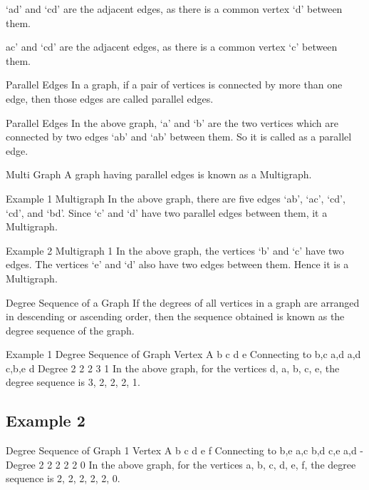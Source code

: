 ‘ad’ and ‘cd’ are the adjacent edges, as there is a common vertex ‘d’ between them.

ac’ and ‘cd’ are the adjacent edges, as there is a common vertex ‘c’ between them.

Parallel Edges
In a graph, if a pair of vertices is connected by more than one edge, then those edges are called parallel edges.

Parallel Edges
In the above graph, ‘a’ and ‘b’ are the two vertices which are connected by two edges ‘ab’ and ‘ab’ between them. So it is called as a parallel edge.

Multi Graph
A graph having parallel edges is known as a Multigraph.

Example 1
Multigraph
In the above graph, there are five edges ‘ab’, ‘ac’, ‘cd’, ‘cd’, and ‘bd’. Since ‘c’ and ‘d’ have two parallel edges between them, it a Multigraph.

Example 2
Multigraph 1
In the above graph, the vertices ‘b’ and ‘c’ have two edges. The vertices ‘e’ and ‘d’ also have two edges between them. Hence it is a Multigraph.

Degree Sequence of a Graph
If the degrees of all vertices in a graph are arranged in descending or ascending order, then the sequence obtained is known as the degree sequence of the graph.

Example 1
Degree Sequence of Graph
Vertex	A	b	c	d	e
Connecting to	b,c	a,d	a,d	c,b,e	d
Degree	2	2	2	3	1
In the above graph, for the vertices {d, a, b, c, e}, the degree sequence is {3, 2, 2, 2, 1}.

\subsection{Example 2}
Degree Sequence of Graph 1
Vertex	A	b	c	d	e	f
Connecting to	b,e	a,c	b,d	c,e	a,d	-
Degree	2	2	2	2	2	0
In the above graph, for the vertices {a, b, c, d, e, f}, the degree sequence is {2, 2, 2, 2, 2, 0}.

\newpage
